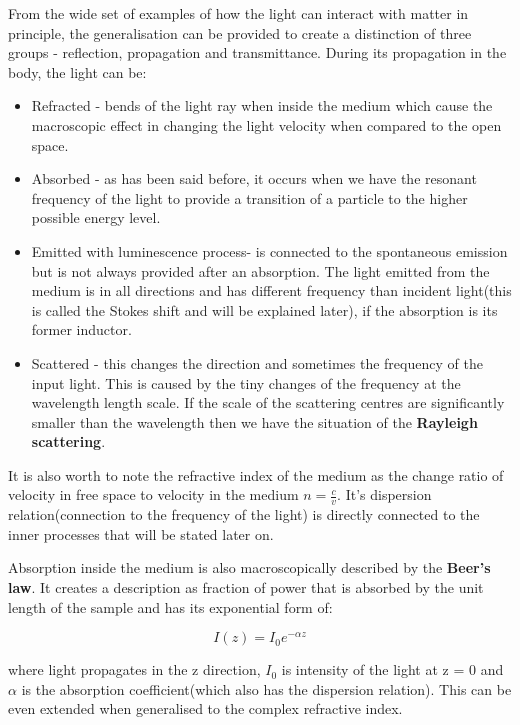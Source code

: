From the wide set of examples of how the light can interact with matter in principle, the generalisation can be provided to create a distinction of three groups - reflection, propagation and transmittance. During its propagation in the body, the light can be:

\begin{itemize}
\item Refracted - bends of the light ray when inside the medium which cause the macroscopic effect in changing the light velocity when compared to the open space. 
\item Absorbed - as has been said before, it occurs when we have the resonant frequency of the light to provide a transition of a particle to the higher possible energy level. 
\item Emitted with luminescence process- is connected to the spontaneous emission but is not always provided after an absorption. The light emitted from the medium is in all directions and has different frequency than incident light(this is called the Stokes shift and will be explained later), if the absorption is its former inductor. 
\item Scattered - this changes the direction and sometimes the frequency of the input light. This is caused by the tiny changes of the frequency at the wavelength length scale. If the scale of the scattering centres are significantly smaller than the wavelength then we have the situation of the \textbf{Rayleigh scattering}.
\end{itemize}

It is also worth to note the refractive index of the medium as the change ratio of velocity in free space to velocity in the medium $n = \frac{c}{v}$. It's dispersion relation(connection to the frequency of the light) is directly connected to the inner processes that will be stated later on. 

Absorption inside the medium is also macroscopically described by the \textbf{Beer's law}. It creates a description as fraction of power that is absorbed by the unit length of the sample and has its exponential form of:

\begin{equation}
I(z) = I_0 e^{-\alpha z}
\end{equation}

where light propagates in the z direction, $I_0$ is intensity of the light at z = 0 and $\alpha$ is the absorption coefficient(which also has the dispersion relation). This can be even extended when generalised to the complex refractive index. 

